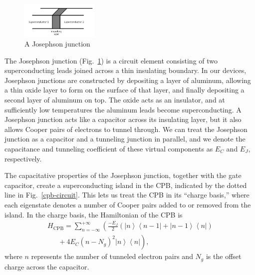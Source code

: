 \documentclass[twocolumn]{revtex4}
\newcommand{\bra}[1]{\left< #1 \right|}
\newcommand{\ket}[1]{\left| #1 \right>}
\newcommand{\figwidth}{0.33\textwidth}
\begin{document}
\begin{figure}
  \includegraphics[width=\figwidth]{junction.png}
  \caption{ A Josephson junction }
  \label{junction}
\end{figure}

The Josephson junction (Fig.~\ref{junction}) is a circuit element
consisting of two superconducting leads joined across a thin
insulating boundary. In our devices, Josephson junctions are
constructed by depositing a layer of aluminum, allowing a thin oxide
layer to form on the surface of that layer, and finally depositing a
second layer of aluminum on top. The oxide acts as an insulator, and
at sufficiently low temperatures the aluminum leads become
superconducting. A Josephson junction acts like a capacitor across its
insulating layer, but it also allows Cooper pairs of electrons to
tunnel through. We can treat the Josephson junction as a capacitor and
a tunneling junction in parallel, and we denote the capacitance and
tunneling coefficient of these virtual components as $E_C$ and $E_J$,
respectively.

The capacitative properties of the Josephson junction, together with
the gate capacitor, create a superconducting island in the CPB,
indicated by the dotted line in Fig.~\ref{cpb-circuit}. This lets us
treat the CPB in its ``charge basis,'' where each eigenstate denotes a
number of Cooper pairs added to or removed from the island. In the
charge basis, the Hamiltonian of the CPB is
\begin{multline}
\label{cpb-H}
  H_{\text{CPB}} = \sum_{n=-\infty}^{+\infty} \left(\frac{-E_J}{2}\left(
      \ket{n}\bra{n-1} + \ket{n-1}\bra{n} \right)\right. \\
  \left.\phantom{\frac{-E_J}{2}} + 4E_C(n-N_g)^2\ket{n}\bra{n}\right),
\end{multline}
where $n$ represents the number of tunneled electron pairs and $N_g$
is the offset charge across the capacitor.
\end{document}
